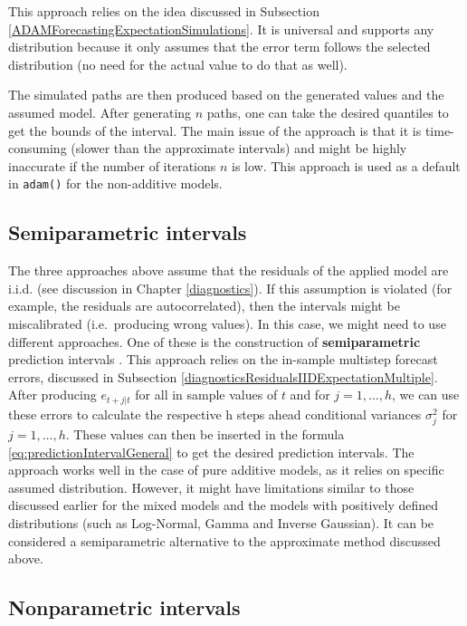\documentclass[
]{book}
\theoremstyle{definition}
\theoremstyle{definition}
\theoremstyle{definition}
\theoremstyle{definition}
\theoremstyle{remark}
\begin{document}
This approach relies on the idea discussed in Subsection \ref{ADAMForecastingExpectationSimulations}. It is universal and supports any distribution because it only assumes that the error term follows the selected distribution (no need for the actual value to do that as well).

The simulated paths are then produced based on the generated values and the assumed model. After generating \(n\) paths, one can take the desired quantiles to get the bounds of the interval. The main issue of the approach is that it is time-consuming (slower than the approximate intervals) and might be highly inaccurate if the number of iterations \(n\) is low. This approach is used as a default in \texttt{adam()} for the non-additive models.

\hypertarget{semiparametric-intervals}{%
\subsection{Semiparametric intervals}\label{semiparametric-intervals}}

The three approaches above assume that the residuals of the applied model are i.i.d. (see discussion in Chapter \ref{diagnostics}). If this assumption is violated (for example, the residuals are autocorrelated), then the intervals might be miscalibrated (i.e.~producing wrong values). In this case, we might need to use different approaches. One of these is the construction of \textbf{semiparametric} prediction intervals \citep[see, for example,][]{Lee2014}. This approach relies on the in-sample multistep forecast errors, discussed in Subsection \ref{diagnosticsResidualsIIDExpectationMultiple}. After producing \(e_{t+j|t}\) for all in sample values of \(t\) and for \(j=1,\dots,h\), we can use these errors to calculate the respective h steps ahead conditional variances \(\sigma_j^2\) for \(j=1,\dots,h\). These values can then be inserted in the formula \eqref{eq:predictionIntervalGeneral} to get the desired prediction intervals. The approach works well in the case of pure additive models, as it relies on specific assumed distribution. However, it might have limitations similar to those discussed earlier for the mixed models and the models with positively defined distributions (such as Log-Normal, Gamma and Inverse Gaussian). It can be considered a semiparametric alternative to the approximate method discussed above.

\hypertarget{nonparametric-intervals}{%
\subsection{Nonparametric intervals}\label{nonparametric-intervals}}
\end{document}
